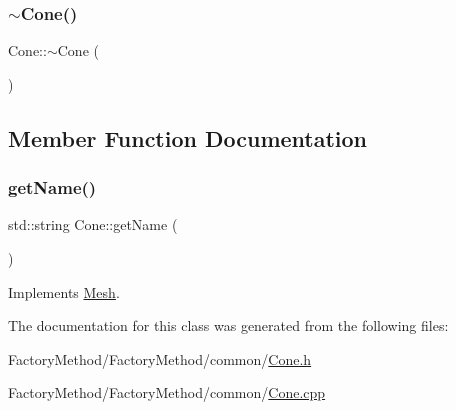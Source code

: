 \subsubsection{\texorpdfstring{$\sim$Cone()}{~Cone()}}
{\footnotesize\ttfamily Cone\+::$\sim$\+Cone (\begin{DoxyParamCaption}{ }\end{DoxyParamCaption})}



\subsection{Member Function Documentation}
\mbox{\label{class_cone_a9581010134e3d1fe079fe5cce1933786}} 
\subsubsection{\texorpdfstring{getName()}{getName()}}
{\footnotesize\ttfamily std\+::string Cone\+::get\+Name (\begin{DoxyParamCaption}{ }\end{DoxyParamCaption})\hspace{0.3cm}{\ttfamily [virtual]}}



Implements \mbox{\hyperlink{class_mesh_aa131fe1c2586fe60988155db77c57272}{Mesh}}.



The documentation for this class was generated from the following files\+:\begin{DoxyCompactItemize}
\item 
Factory\+Method/\+Factory\+Method/common/\mbox{\hyperlink{_cone_8h}{Cone.\+h}}\item 
Factory\+Method/\+Factory\+Method/common/\mbox{\hyperlink{_cone_8cpp}{Cone.\+cpp}}\end{DoxyCompactItemize}
